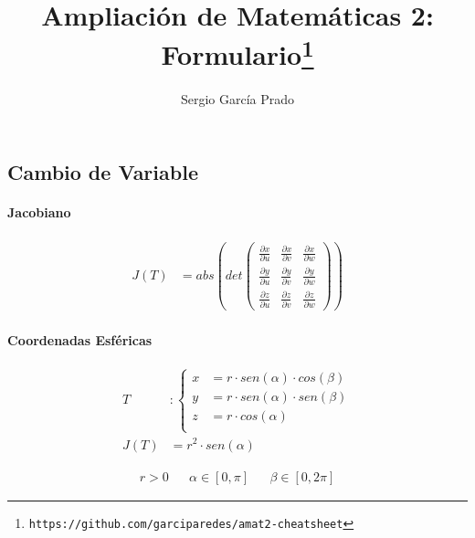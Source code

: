 \documentclass[a4paper]{article}
\title{\vspace{-2em}Ampliación de Matemáticas 2: Formulario\footnote{\texttt{https://github.com/garciparedes/amat2-cheatsheet}}}
\author{Sergio García Prado}
\begin{document}

  \maketitle

  \begin{multicols}{2}


    \section{Cambio de Variable}

      \paragraph{Jacobiano}

      \begin{align*}
        J(T) &= abs\left(det\left(
          \begin{array}{ccc}
            \frac{\partial x}{\partial u} & \frac{\partial x}{\partial v} & \frac{\partial x}{\partial w} \\
            \frac{\partial y}{\partial u} & \frac{\partial y}{\partial v} & \frac{\partial y}{\partial w} \\
            \frac{\partial z}{\partial u} & \frac{\partial z}{\partial v} & \frac{\partial z}{\partial w}
          \end{array}
        \right)\right)
      \end{align*}

      \paragraph{Coordenadas Esféricas}

        \begin{align*}
          T &:
          \begin{cases}
            x &= r \cdot sen(\alpha) \cdot cos(\beta) \\
            y &= r \cdot sen(\alpha) \cdot sen(\beta) \\
            z &= r \cdot cos(\alpha) \\
          \end{cases} \\
          J(T) &= r ^ 2 \cdot sen(\alpha)
        \end{align*}

        \begin{align*}
          r > 0 && \alpha \in[0,\pi]&& \beta \in [0,2\pi]
        \end{align*}


\end{multicols}
\end{document}
